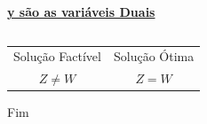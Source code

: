 \documentclass{beamer}
\begin{document}
\begin{frame}
\begin{columns}
\begin{column}{4cm}
\begin{mdframed}[backgroundcolor=red!50]
\begin{table}
\begin{tabular}{l}
					\end{tabular}
				\end{table}
			\end{mdframed}
			\underline{\textbf{y são as variáveis Duais}}
		\end{column}
	\end{columns}	
	\begin{table}
		\Large
		\begin{tabular}{c c}
			\color{orange} Solução Factível & \color{orange}Solução Ótima \\
			\color{orange} $ Z \ne W $      & \color{orange}$ Z = W$ \\ 
		\end{tabular}
	\end{table}
\end{frame}


\begin{frame}
\Huge{\centerline{Fim}}
\end{frame}

\end{document}

